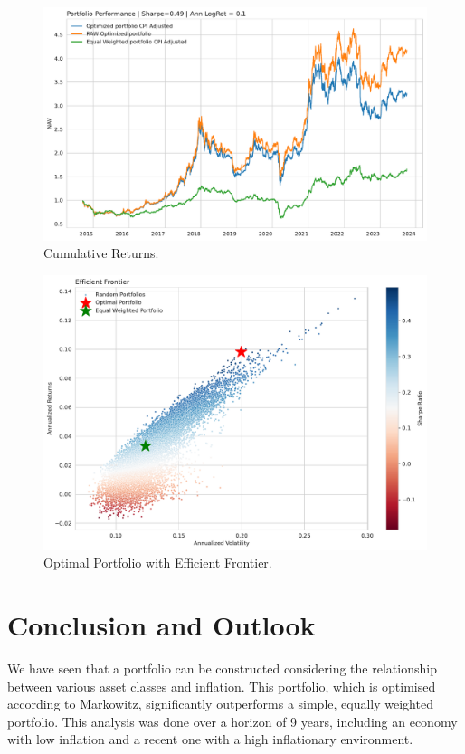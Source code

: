 \documentclass{article}
\begin{document}
\begin{figure}[H]
    \centering
    \includegraphics[width=1\textwidth]{figure/PNL.pdf}
    \caption{Cumulative Returns.}
    \label{fig:mesh4}
\end{figure}

\begin{figure}[H]
    \centering
    \includegraphics[width=1\textwidth]{figure/Optimal_PF.pdf}
    \caption{Optimal Portfolio with Efficient Frontier.}
    \label{fig:mesh5}
\end{figure}

\newpage

\section{Conclusion and Outlook}

We have seen that a portfolio can be constructed considering the relationship between various asset classes and inflation. This portfolio, which is optimised according to Markowitz, significantly outperforms a simple, equally weighted portfolio. This analysis was done over a horizon of 9 years, including an economy with low inflation and a recent one with a high inflationary environment. \\
\end{document}
